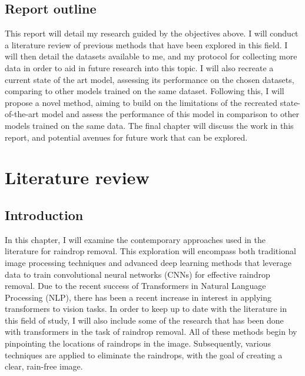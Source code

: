 \documentclass[11pt]{ociamthesis}  %
\begin{document}
\section{Report outline}
This report will detail my research guided by the objectives above. I will conduct a literature review of previous methods that have been explored in this field. I will then detail the datasets available to me, and my protocol for collecting more data in order to aid in future research into this topic. I will also recreate a current state of the art model, assessing its performance on the chosen datasets, comparing to other models trained on the same dataset. Following this, I will propose a novel method, aiming to build on the limitations of the recreated state-of-the-art model and assess the performance of this model in comparison to other models trained on the same data. The final chapter will discuss the work in this report, and potential avenues for future work that can be explored.


\chapter{Literature review}
\label{Section:Literature Review}

\section{Introduction}
In this chapter, I will examine the contemporary approaches used in the literature for raindrop removal. This exploration will encompass both traditional image processing techniques and advanced deep learning methods that leverage data to train convolutional neural networks (CNNs) for effective raindrop removal. Due to the recent success of Transformers in Natural Language Processing (NLP), there has been a recent increase in interest in applying transformers to vision tasks. In order to keep up to date with the literature in this field of study, I will also include some of the research that has been done with transformers in the task of raindrop removal. All of these methods begin by pinpointing the locations of raindrops in the image. Subsequently, various techniques are applied to eliminate the raindrops, with the goal of creating a clear, rain-free image.
\end{document}
